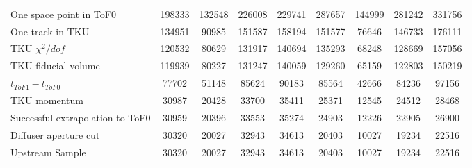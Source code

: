 \begin{landscape}
\begin{table}
\begin{tabular}[pos]{l|cccccccc}
One space point in ToF0                            &  198333  &  132548  &  226008  &  229741  &  287657  &  144999  &  281242  &  331756  \\
One track in TKU                                   &  134951  &   90985  &  151587  &  158194  &  151577  &   76646  &  146733  &  176111  \\
TKU $\chi^2/dof$                                   &  120532  &   80629  &  131917  &  140694  &  135293  &   68248  &  128669  &  157056  \\
TKU fiducial volume                                &  119939  &   80227  &  131247  &  140059  &  129260  &   65159  &  122803  &  150219  \\
\hline                                            
$t_{ToF1} - t_{ToF0}$                              &   77702  &   51148  &   85624  &   90183  &   85564  &   42666  &   84236  &   97156  \\
TKU momentum                                       &   30987  &   20428  &   33700  &   35411  &   25371  &   12545  &   24512  &   28468  \\
\hline                                            
Successful extrapolation to ToF0                   &   30959  &   20396  &   33553  &   35274  &   24903  &   12226  &   22905  &   26900  \\
Diffuser aperture cut                              &   30320  &   20027  &   32943  &   34613  &   20403  &   10027  &   19234  &   22516  \\
\hline                                            
Upstream Sample                                    &   30320  &   20027  &   32943  &   34613  &   20403  &   10027  &   19234  &   22516  \\
\hline                                            

\end{tabular}
\end{table}
\end{landscape}

